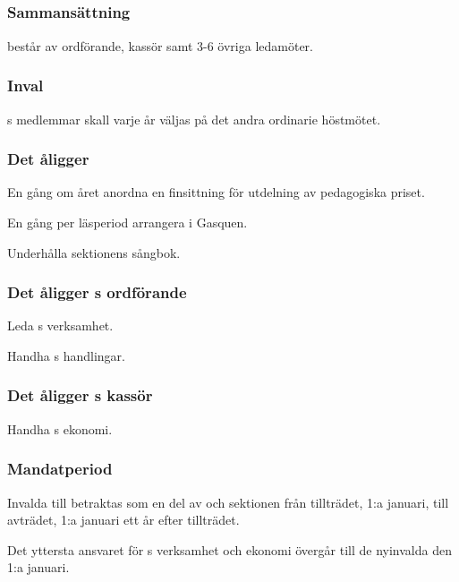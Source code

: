\subsection{\SEXITFULL}
\subsubsection{Sammansättning}
\SEXIT{} består av ordförande, kassör samt 3-6 övriga ledamöter.

\subsubsection{Inval}
\SEXIT{}s medlemmar skall varje år väljas på det andra ordinarie höstmötet.

\subsubsection{Det åligger \SEXIT}
\begin{att}
	\item En gång om året anordna en finsittning för utdelning av pedagogiska priset.
	\item En gång per läsperiod arrangera i Gasquen.
	\item Underhålla sektionens sångbok. 
\end{att}

\subsubsection{Det åligger \SEXIT{}s ordförande}
\begin{att}
	\item Leda \SEXIT{}s verksamhet.
	\item Handha \SEXIT{}s handlingar.
\end{att}

\subsubsection{Det åligger \SEXIT{}s kassör}
\begin{att}
	\item Handha \SEXIT{}s ekonomi.
\end{att}

\subsubsection{Mandatperiod}
Invalda till \SEXIT{} betraktas som en del av \SEXIT{} och sektionen från tillträdet, 1:a januari, till avträdet, 1:a januari ett år efter tillträdet.

Det yttersta ansvaret för \SEXIT{}s verksamhet och ekonomi övergår till de nyinvalda den 1:a januari.